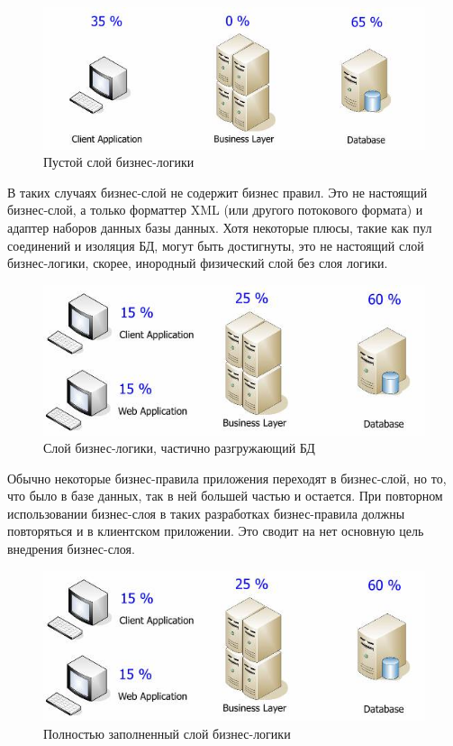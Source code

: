 \documentclass[a4paper, 14pt]{extarticle}
\begin{document}
\begin{figure}[!htb]
  \centering
    \includegraphics[scale=0.6]{../shared_images/business-logic/client-server-business.jpg}
   \caption{Пустой слой бизнес-логики}
    \label{fig:start}
\end{figure}

В таких случаях бизнес-слой не содержит бизнес правил. Это не настоящий бизнес-слой, а только форматтер XML (или другого потокового формата) и адаптер наборов данных базы данных. Хотя некоторые плюсы, такие как пул соединений и изоляция БД, могут быть достигнуты, это не настоящий слой бизнес-логики, скорее, инородный физический слой без слоя логики.

\begin{figure}[!htb]
  \centering
    \includegraphics[scale=0.6]{../shared_images/business-logic/client-server-business-2.jpg}
   \caption{Слой бизнес-логики, частично разгружающий БД}
    \label{fig:start}
\end{figure}

Обычно некоторые бизнес-правила приложения переходят в бизнес-слой, но то, что было в базе данных, так в ней большей частью и остается. При повторном использовании бизнес-слоя в таких разработках бизнес-правила должны повторяться и в клиентском приложении. Это сводит на нет основную цель внедрения бизнес-слоя.

\begin{figure}[!htb]
  \centering
    \includegraphics[scale=0.6]{../shared_images/business-logic/client-server-business-2.jpg}
   \caption{Полностью заполненный слой бизнес-логики}
    \label{fig:start}
\end{figure}
\end{document}
